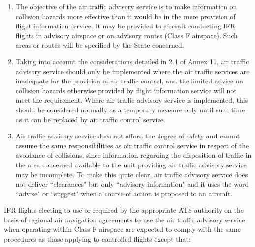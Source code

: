 \begin{enumeratesc}
    \begin{enumerate}
        \item The objective of the air traffic advisory service is to make information on collision hazards more effective than it would be in the mere provision of flight information service. It may be provided to aircraft conducting IFR flights in advisory airspace or on advisory routes (Class F airspace). Such areas or routes will be specified by the State concerned.
        \item Taking into account the considerations detailed in 2.4 of Annex 11, air traffic advisory service should only be implemented where the air traffic services are inadequate for the provision of air traffic control, and the limited advice on collision hazards otherwise provided by flight information service will not meet the requirement. Where air traffic advisory service is implemented, this should be considered normally as a temporary measure only until such time as it can be replaced by air traffic control service.
        \item Air traffic advisory service does not afford the degree of safety and cannot assume the same responsibilities as air traffic control service in respect of the avoidance of collisions, since information regarding the disposition of traffic in the area concerned available to the unit providing air traffic advisory service may be incomplete. To make this quite clear, air traffic advisory service does not deliver ``clearances" but only ``advisory information" and it uses the word ``advise" or ``suggest" when a course of action is proposed to an aircraft.
    \end{enumerate}

    \begin{enumerate}[labelindent=0pt,itemsep=0.2cm]
         \label{9.1.4.2.1}
        
        \noindent IFR flights electing to use or required by the appropriate ATS authority on the basis of regional air navigation agreements to use the air traffic advisory service when operating within Class F airspace are expected to comply with the same procedures as those applying to controlled flights except that:


\end{enumerate}
\end{enumeratesc}
